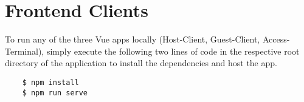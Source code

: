 \section{Frontend Clients}

To run any of the three Vue apps locally (Host-Client, Guest-Client, Access-Terminal), simply execute the following two lines of code in the respective root directory of the application to install the dependencies and host the app.

\begin{lstlisting}
    $ npm install
    $ npm run serve
\end{lstlisting}
